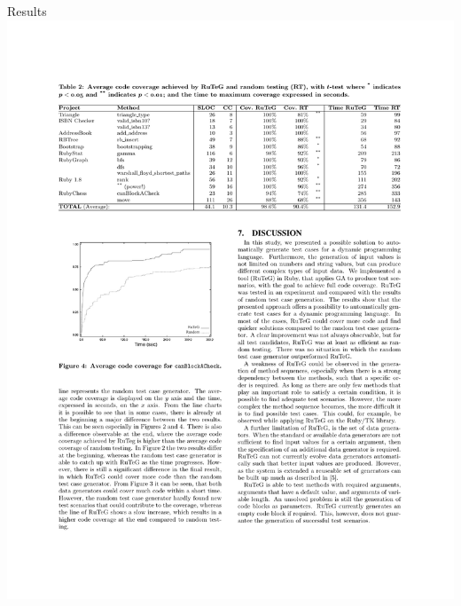 \documentclass{beamer}
\begin{document}
\begin{frame}{Results}
  \hspace*{-1cm}%
  \includegraphics[width=0.99\paperwidth]{table_res}
\end{frame}
\end{document}

